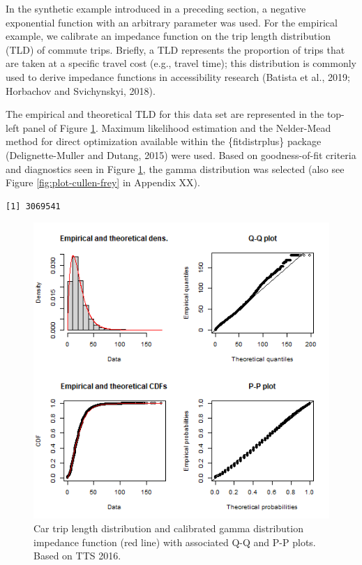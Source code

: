 \documentclass[]{elsarticle} %
\begin{document}
In the synthetic example introduced in a preceding section, a negative
exponential function with an arbitrary parameter was used. For the
empirical example, we calibrate an impedance function on the trip length
distribution (TLD) of commute trips. Briefly, a TLD represents the
proportion of trips that are taken at a specific travel cost (e.g.,
travel time); this distribution is commonly used to derive impedance
functions in accessibility research (Batista et al., 2019; Horbachov and
Svichynskyi, 2018).

The empirical and theoretical TLD for this data set are represented in
the top-left panel of Figure \ref{fig:TLD-Gamma-plot}. Maximum
likelihood estimation and the Nelder-Mead method for direct optimization
available within the \{fitdistrplus\} package (Delignette-Muller and
Dutang, 2015) were used. Based on goodness-of-fit criteria and
diagnostics seen in Figure \ref{fig:TLD-Gamma-plot}, the gamma
distribution was selected (also see Figure \ref{fig:plot-cullen-frey} in
Appendix XX).

\begin{verbatim}
[1] 3069541
\end{verbatim}

\begin{figure}

{\centering \includegraphics[width=0.8\linewidth]{images/impedance_function} 

}

\caption{\label{fig:TLD-Gamma-plot}Car trip length distribution and calibrated gamma distribution impedance function (red line) with associated Q-Q and P-P plots. Based on TTS 2016.}\label{fig:TLD-Gamma-plot}
\end{figure}
\end{document}
